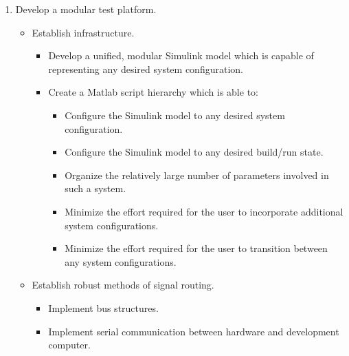 \documentclass[crop=false,float=true,class=scrreprt]{standalone}
\begin{document}
\begin{enumerate}[leftmargin=*]
\item Develop a modular test platform.
\begin{itemize}[leftmargin=*]

  \item Establish infrastructure.
  \begin{itemize}[leftmargin=*, label=$\vcenter{\hbox{\tiny$\bullet$}}$]

    \item Develop a unified, modular Simulink model which is capable of representing any desired system configuration.
    
    \item Create a Matlab script hierarchy which is able to:
    \begin{itemize}[leftmargin=*, label=$\cdot$]
    
      \item Configure the Simulink model to any desired system configuration.
      
      \item Configure the Simulink model to any desired build/run state.
      
      \item Organize the relatively large number of parameters involved in such a system. 
      
      \item Minimize the effort required for the user to incorporate additional system configurations.
    
      \item Minimize the effort required for the user to transition between any system configurations.
    
    \end{itemize}
        
  \end{itemize}
  
  \item Establish robust methods of signal routing.
  \begin{itemize}[leftmargin=*, label=$\vcenter{\hbox{\tiny$\bullet$}}$]
  
    \item Implement bus structures.

    \item Implement serial communication between hardware and development computer.
    \begin{itemize}[leftmargin=*, label=$\cdot$]
    

\end{itemize}
\end{itemize}
\end{itemize}
\end{enumerate}
\end{document}
